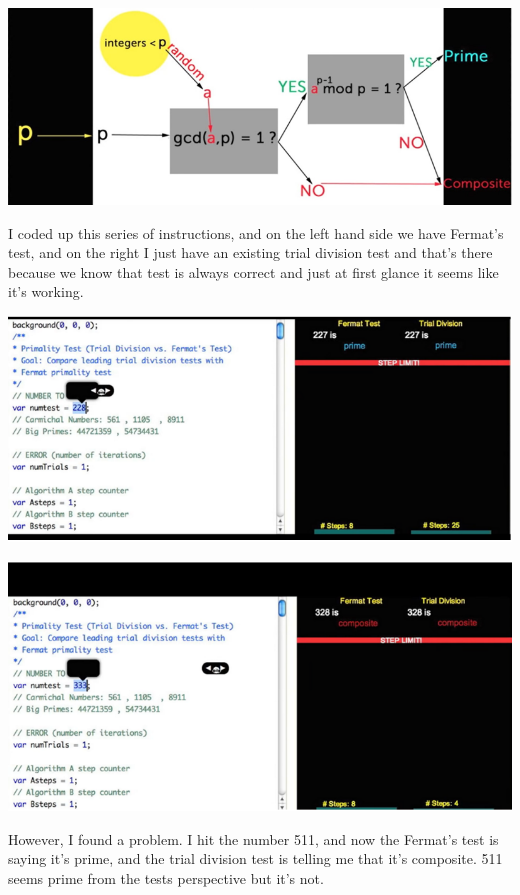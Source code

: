 \documentclass{report}
\begin{document}
 \begin{center}
	\includegraphics[scale=1]{89.png}
\end{center}
 I coded up this series of instructions, and on the left hand side we have Fermat's test, and on the right I just have an existing trial division test and that's there because we know that test is always correct and just at first glance it seems like it's working.
 \begin{center}
	\includegraphics[scale=1]{90.png}
\end{center}
 \begin{center}
	\includegraphics[scale=1]{91.png}
\end{center}
 However, I found a problem. I hit the number 511, and now the Fermat's test is saying it's prime, and the trial division test is telling me that it's composite. 511 seems prime from the tests perspective but it's not.
\end{document}
